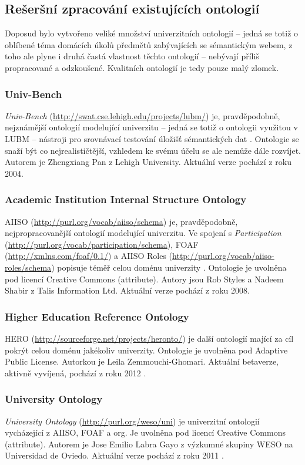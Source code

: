 \subsection{Rešeršní zpracování existujících ontologií}
Doposud bylo vytvořeno veliké množství univerzitních ontologií -- jedná se totiž o oblíbené téma domácích úkolů předmětů zabývajících se sémantickým webem, z toho ale plyne i druhá častá vlastnost těchto ontologií -- nebývají příliš propracované a odzkoušené. Kvalitních ontologií je tedy pouze malý zlomek.

\subsubsection{Univ-Bench}
\emph{Univ-Bench} (\url{http://swat.cse.lehigh.edu/projects/lubm/}) je, pravděpodobně, nejznámější ontologií modelující univerzitu -- jedná se totiž o ontologii využitou v \gls{LUBM} -- nástroji pro srovnávací testování úložišť sémantických dat \cite{Lubm}. Ontologie se snaží být co nejrealističtější, vzhledem ke svému účelu se ale nemůže dále rozvíjet. Autorem je Zhengxiang Pan z Lehigh University. Aktuální verze pochází z roku 2004.

\subsubsection{Academic Institution Internal Structure Ontology}
\Gls{AIISO} (\url{http://purl.org/vocab/aiiso/schema}) je, pravděpodobně, nejpropracovanější ontologií modelující univerzitu. Ve spojení s \emph{Participation} (\url{http://purl.org/vocab/participation/schema}), \gls{FOAF} (\url{http://xmlns.com/foaf/0.1/}) a \gls{AIISO} Roles (\url{http://purl.org/vocab/aiiso-roles/schema}) popisuje téměř celou doménu univerzity \cite{Aiiso}. Ontologie je uvolněna pod licencí Creative Commons (attribute). Autory jsou Rob Styles a Nadeem Shabir z Talis Information Ltd. Aktuální verze pochází z roku 2008.

\subsubsection{Higher Education Reference Ontology}
\Gls{HERO} (\url{http://sourceforge.net/projects/heronto/}) je další ontologií mající za cíl pokrýt celou doménu jakékoliv univerzity. Ontologie je uvolněna pod Adaptive Public License. Autorkou je Leila Zemmouchi-Ghomari. Aktuální betaverze, aktivně vyvíjená, pochází z roku 2012 \cite{Hero}.

\subsubsection{University Ontology}
\emph{University Ontology} (\url{http://purl.org/weso/uni}) je univerzitní ontologií vycházející z \gls{AIISO}, \gls{FOAF} a \gls{org}. Je uvolněna pod licencí Creative Commons (attribute). Autorem je Jose Emilio Labra Gayo z výzkumné skupiny WESO na Universidad de Oviedo. Aktuální verze pochází z roku 2011 \cite{Weso}.

